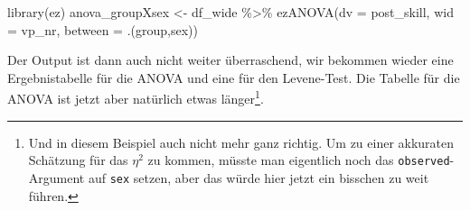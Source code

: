 \documentclass[
]{book}
\newenvironment{Shaded}{\begin{snugshade}}{\end{snugshade}}
\newcommand{\AttributeTok}[1]{\textcolor[rgb]{0.77,0.63,0.00}{#1}}
\newcommand{\FunctionTok}[1]{\textcolor[rgb]{0.00,0.00,0.00}{#1}}
\newcommand{\NormalTok}[1]{#1}
\newcommand{\OtherTok}[1]{\textcolor[rgb]{0.56,0.35,0.01}{#1}}
\newcommand{\SpecialCharTok}[1]{\textcolor[rgb]{0.00,0.00,0.00}{#1}}
\begin{document}
\begin{Shaded}
\begin{Highlighting}[]
\FunctionTok{library}\NormalTok{(ez)}
\NormalTok{anova\_groupXsex }\OtherTok{\textless{}{-}} 
\NormalTok{  df\_wide }\SpecialCharTok{\%\textgreater{}\%} 
  \FunctionTok{ezANOVA}\NormalTok{(}\AttributeTok{dv =}\NormalTok{ post\_skill,}
          \AttributeTok{wid =}\NormalTok{ vp\_nr,}
          \AttributeTok{between =}\NormalTok{ .(group,sex))}
\end{Highlighting}
\end{Shaded}

Der Output ist dann auch nicht weiter überraschend, wir bekommen wieder eine Ergebnistabelle für die ANOVA und eine für den Levene-Test. Die Tabelle für die ANOVA ist jetzt aber natürlich etwas länger\footnote{Und in diesem Beispiel auch nicht mehr ganz richtig. Um zu einer akkuraten Schätzung für das \(\eta^2\) zu kommen, müsste man eigentlich noch das \texttt{observed}-Argument auf \texttt{sex} setzen, aber das würde hier jetzt ein bisschen zu weit führen.}.

\begin{Shaded}
\end{Shaded}

 
  \providecommand{\huxb}[2]{\arrayrulecolor[RGB]{#1}\global\arrayrulewidth=#2pt}
  \providecommand{\huxvb}[2]{\color[RGB]{#1}\vrule width #2pt}
  \providecommand{\huxtpad}[1]{\rule{0pt}{#1}}
  \providecommand{\huxbpad}[1]{\rule[-#1]{0pt}{#1}}
\end{document}
